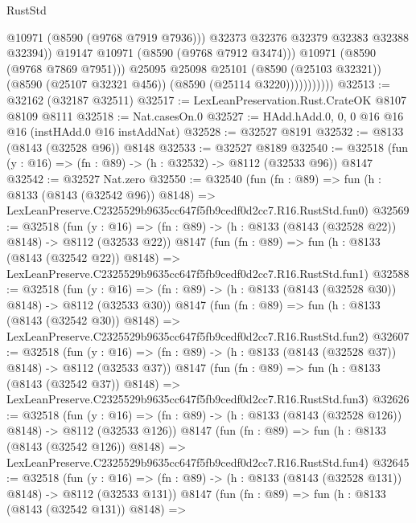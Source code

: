 \begin{lexlean}{RustStd}
\begin{coremodule}
                                @10971
                                (@8590 (@9768 @7919 @7936)))
                              @32373
                              @32376
                              @32379
                              @32383
                              @32388
                              @32394))
                          @19147
                          @10971
                          (@8590 (@9768 @7912 @3474)))
                        @10971
                        (@8590 (@9768 @7869 @7951)))
                      @25095
                      @25098
                      @25101
                      (@8590 (@25103 @32321))
                      (@8590 (@25107 @32321 @456))
                      (@8590 (@25114 @3220)))))))))))
@32513 := @32162 (@32187 @32511)
@32517 := LexLeanPreservation.Rust.CrateOK @8107 @8109 @8111
@32518 := Nat.casesOn.{0}
@32527 := HAdd.hAdd.{0, 0, 0} @16 @16 @16 (instHAdd.{0} @16 instAddNat)
@32528 := @32527 @8191
@32532 := @8133 (@8143 (@32528 @96)) @8148
@32533 := @32527 @8189
@32540 := @32518 (fun (y : @16) => (fn : @89) -> (h : @32532) -> @8112 (@32533 @96)) @8147
@32542 := @32527 Nat.zero
@32550 := @32540
    (fun (fn : @89) =>
    fun (h : @8133 (@8143 (@32542 @96)) @8148) =>
    LexLeanPreserve.C2325529b9635cc647f5fb9cedf0d2cc7.R16.RustStd.fun0)
@32569 := @32518
    (fun (y : @16) => (fn : @89) -> (h : @8133 (@8143 (@32528 @22)) @8148) -> @8112 (@32533 @22))
    @8147
    (fun (fn : @89) =>
    fun (h : @8133 (@8143 (@32542 @22)) @8148) =>
    LexLeanPreserve.C2325529b9635cc647f5fb9cedf0d2cc7.R16.RustStd.fun1)
@32588 := @32518
    (fun (y : @16) => (fn : @89) -> (h : @8133 (@8143 (@32528 @30)) @8148) -> @8112 (@32533 @30))
    @8147
    (fun (fn : @89) =>
    fun (h : @8133 (@8143 (@32542 @30)) @8148) =>
    LexLeanPreserve.C2325529b9635cc647f5fb9cedf0d2cc7.R16.RustStd.fun2)
@32607 := @32518
    (fun (y : @16) => (fn : @89) -> (h : @8133 (@8143 (@32528 @37)) @8148) -> @8112 (@32533 @37))
    @8147
    (fun (fn : @89) =>
    fun (h : @8133 (@8143 (@32542 @37)) @8148) =>
    LexLeanPreserve.C2325529b9635cc647f5fb9cedf0d2cc7.R16.RustStd.fun3)
@32626 := @32518
    (fun (y : @16) => (fn : @89) -> (h : @8133 (@8143 (@32528 @126)) @8148) -> @8112 (@32533 @126))
    @8147
    (fun (fn : @89) =>
    fun (h : @8133 (@8143 (@32542 @126)) @8148) =>
    LexLeanPreserve.C2325529b9635cc647f5fb9cedf0d2cc7.R16.RustStd.fun4)
@32645 := @32518
    (fun (y : @16) => (fn : @89) -> (h : @8133 (@8143 (@32528 @131)) @8148) -> @8112 (@32533 @131))
    @8147
    (fun (fn : @89) =>
    fun (h : @8133 (@8143 (@32542 @131)) @8148) =>

\end{coremodule}
\end{lexlean}
